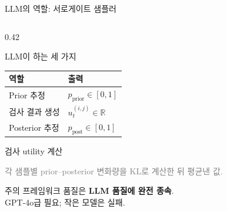 \documentclass[
11pt,notheorems,hyperref={pdfauthor=whatever}
]{beamer}
\begin{document}
\begin{frame}{LLM의 역할: 서로게이트 샘플러}
\begin{columns}[c]
\begin{column}{0.42\textwidth}
    \begin{block}{LLM이 하는 세 가지}
    \footnotesize
    \begin{tabular}{ll}
        \toprule
        역할 & 출력 \\
        \midrule
        Prior 추정    & $p_{\text{prior}} \in [0,1]$ \\
        검사 결과 생성 & $u^{(i,j)}_t \in \mathbb{R}$ \\
        Posterior 추정 & $p_{\text{post}} \in [0,1]$ \\
        \bottomrule
    \end{tabular}
    \end{block}

    \vspace{0.4em}

    \begin{block}{검사 utility 계산}
    \footnotesize
    \begin{center}
    \end{center}
    \vspace{-0.4em}
    \scriptsize
    \textcolor{gray}{각 샘플별 prior--posterior 변화량을 KL로 계산한 뒤 평균낸 값.}
    \end{block}

    \vspace{0.3em}

    \begin{alertblock}{주의}
    \footnotesize
    프레임워크 품질은 \textbf{LLM 품질에 완전 종속}.\\
    GPT-4o급 필요; 작은 모델은 실패.
    \end{alertblock}

\end{column}

\end{columns}
\end{frame}
\end{document}
